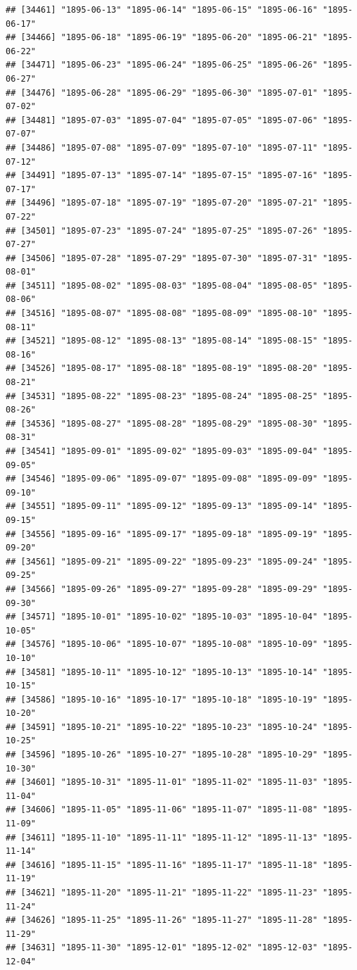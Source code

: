 \documentclass{article}\usepackage[]{graphicx}\usepackage[]{color}
\makeatletter
\newenvironment{kframe}{%
 \def\at@end@of@kframe{}%
 \ifinner\ifhmode%
  \def\at@end@of@kframe{\end{minipage}}%
  \begin{minipage}{\columnwidth}%
 \fi\fi%
 \def\FrameCommand##1{\hskip\@totalleftmargin \hskip-\fboxsep
 \colorbox{shadecolor}{##1}\hskip-\fboxsep
     \hskip-\linewidth \hskip-\@totalleftmargin \hskip\columnwidth}%
 \MakeFramed {\advance\hsize-\width
   \@totalleftmargin\z@ \linewidth\hsize
   \@setminipage}}%
 {\par\unskip\endMakeFramed%
 \at@end@of@kframe}
\newenvironment{knitrout}{}{} %
\makeatother
\begin{document}
\begin{description}
\begin{knitrout}
\begin{kframe}
\begin{verbatim}
## [34461] "1895-06-13" "1895-06-14" "1895-06-15" "1895-06-16" "1895-06-17"
## [34466] "1895-06-18" "1895-06-19" "1895-06-20" "1895-06-21" "1895-06-22"
## [34471] "1895-06-23" "1895-06-24" "1895-06-25" "1895-06-26" "1895-06-27"
## [34476] "1895-06-28" "1895-06-29" "1895-06-30" "1895-07-01" "1895-07-02"
## [34481] "1895-07-03" "1895-07-04" "1895-07-05" "1895-07-06" "1895-07-07"
## [34486] "1895-07-08" "1895-07-09" "1895-07-10" "1895-07-11" "1895-07-12"
## [34491] "1895-07-13" "1895-07-14" "1895-07-15" "1895-07-16" "1895-07-17"
## [34496] "1895-07-18" "1895-07-19" "1895-07-20" "1895-07-21" "1895-07-22"
## [34501] "1895-07-23" "1895-07-24" "1895-07-25" "1895-07-26" "1895-07-27"
## [34506] "1895-07-28" "1895-07-29" "1895-07-30" "1895-07-31" "1895-08-01"
## [34511] "1895-08-02" "1895-08-03" "1895-08-04" "1895-08-05" "1895-08-06"
## [34516] "1895-08-07" "1895-08-08" "1895-08-09" "1895-08-10" "1895-08-11"
## [34521] "1895-08-12" "1895-08-13" "1895-08-14" "1895-08-15" "1895-08-16"
## [34526] "1895-08-17" "1895-08-18" "1895-08-19" "1895-08-20" "1895-08-21"
## [34531] "1895-08-22" "1895-08-23" "1895-08-24" "1895-08-25" "1895-08-26"
## [34536] "1895-08-27" "1895-08-28" "1895-08-29" "1895-08-30" "1895-08-31"
## [34541] "1895-09-01" "1895-09-02" "1895-09-03" "1895-09-04" "1895-09-05"
## [34546] "1895-09-06" "1895-09-07" "1895-09-08" "1895-09-09" "1895-09-10"
## [34551] "1895-09-11" "1895-09-12" "1895-09-13" "1895-09-14" "1895-09-15"
## [34556] "1895-09-16" "1895-09-17" "1895-09-18" "1895-09-19" "1895-09-20"
## [34561] "1895-09-21" "1895-09-22" "1895-09-23" "1895-09-24" "1895-09-25"
## [34566] "1895-09-26" "1895-09-27" "1895-09-28" "1895-09-29" "1895-09-30"
## [34571] "1895-10-01" "1895-10-02" "1895-10-03" "1895-10-04" "1895-10-05"
## [34576] "1895-10-06" "1895-10-07" "1895-10-08" "1895-10-09" "1895-10-10"
## [34581] "1895-10-11" "1895-10-12" "1895-10-13" "1895-10-14" "1895-10-15"
## [34586] "1895-10-16" "1895-10-17" "1895-10-18" "1895-10-19" "1895-10-20"
## [34591] "1895-10-21" "1895-10-22" "1895-10-23" "1895-10-24" "1895-10-25"
## [34596] "1895-10-26" "1895-10-27" "1895-10-28" "1895-10-29" "1895-10-30"
## [34601] "1895-10-31" "1895-11-01" "1895-11-02" "1895-11-03" "1895-11-04"
## [34606] "1895-11-05" "1895-11-06" "1895-11-07" "1895-11-08" "1895-11-09"
## [34611] "1895-11-10" "1895-11-11" "1895-11-12" "1895-11-13" "1895-11-14"
## [34616] "1895-11-15" "1895-11-16" "1895-11-17" "1895-11-18" "1895-11-19"
## [34621] "1895-11-20" "1895-11-21" "1895-11-22" "1895-11-23" "1895-11-24"
## [34626] "1895-11-25" "1895-11-26" "1895-11-27" "1895-11-28" "1895-11-29"
## [34631] "1895-11-30" "1895-12-01" "1895-12-02" "1895-12-03" "1895-12-04"

\end{verbatim}
\end{kframe}
\end{knitrout}
\end{description}
\end{document}

